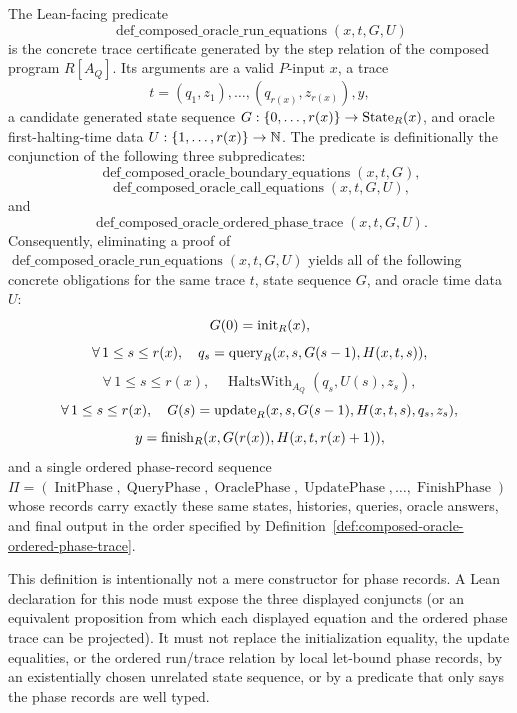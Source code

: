 \begin{definition}
  \label{def:composed-oracle-run-equations}
  The Lean-facing predicate
  \[
    \operatorname{def\_composed\_oracle\_run\_equations}(x,t,G,U)
  \]
  is the concrete trace certificate generated by the step relation of the
  composed program $R[A_Q]$.  Its arguments are a valid $P$-input $x$, a trace
  \[
    t=(q_1,z_1),\ldots,(q_{r(x)},z_{r(x)}),y,
  \]
  a candidate generated state sequence
  $G:\{0,\ldots,r(x)\}\to\operatorname{State}_R(x)$, and oracle first-halting-time data
  $U:\{1,\ldots,r(x)\}\to\mathbb{N}$.  The predicate is definitionally the conjunction
  of the following three subpredicates:
  \[
    \operatorname{def\_composed\_oracle\_boundary\_equations}(x,t,G),
  \]
  \[
    \operatorname{def\_composed\_oracle\_call\_equations}(x,t,G,U),
  \]
  and
  \[
    \operatorname{def\_composed\_oracle\_ordered\_phase\_trace}(x,t,G,U).
  \]
  Consequently, eliminating a proof of
  $\operatorname{def\_composed\_oracle\_run\_equations}(x,t,G,U)$ yields all of
  the following concrete obligations for the same trace $t$, state sequence
  $G$, and oracle time data $U$:
  \[
    G(0)=\operatorname{init}_R(x),
  \]
  \[
    \forall\,1\leq s\leq r(x),\quad
      q_s=\operatorname{query}_R(x,s,G(s-1),H(x,t,s)),
  \]
  \[
    \forall\,1\leq s\leq r(x),\quad
      \operatorname{HaltsWith}_{A_Q}(q_s,U(s),z_s),
  \]
  \[
    \forall\,1\leq s\leq r(x),\quad
      G(s)=\operatorname{update}_R(x,s,G(s-1),H(x,t,s),q_s,z_s),
  \]
  \[
    y=\operatorname{finish}_R(x,G(r(x)),H(x,t,r(x)+1)),
  \]
  and a single ordered phase-record sequence
  $\Pi=(\operatorname{InitPhase},\operatorname{QueryPhase},
  \operatorname{OraclePhase},\operatorname{UpdatePhase},\ldots,
  \operatorname{FinishPhase})$ whose records carry exactly these same states,
  histories, queries, oracle answers, and final output in the order specified
  by Definition~\ref{def:composed-oracle-ordered-phase-trace}.

  This definition is intentionally not a mere constructor for phase records.
  A Lean declaration for this node must expose the three displayed conjuncts
  (or an equivalent proposition from which each displayed equation and the
  ordered phase trace can be projected).  It must not replace the initialization
  equality, the update equalities, or the ordered run/trace relation by local
  let-bound phase records, by an existentially chosen unrelated state sequence,
  or by a predicate that only says the phase records are well typed.
\end{definition}

